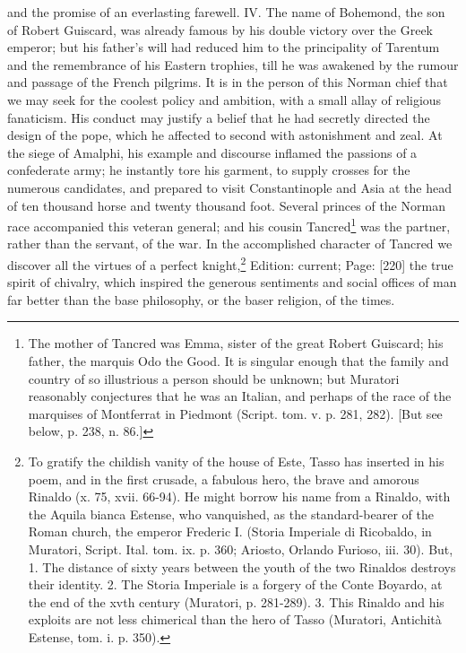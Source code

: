 and the promise of an everlasting farewell. IV. The name of Bohemond, the son of Robert Guiscard, was already famous by his double victory over the Greek emperor; but his father\texthebrew{}’s will had reduced him to the principality of Tarentum and the remembrance of his Eastern trophies, till he was awakened by the rumour and passage of the French pilgrims. It is in the person of this Norman chief that we may seek for the coolest policy and ambition, with a small allay of religious fanaticism. His conduct may justify a belief that he had secretly directed the design of the pope, which he affected to second with astonishment and zeal. At the siege of Amalphi, his example and discourse inflamed the passions of a confederate army; he instantly tore his garment, to supply crosses for the numerous candidates, and prepared to visit Constantinople and Asia at the head of ten thousand horse and twenty thousand foot. Several princes of the Norman race accompanied this veteran general; and his cousin Tancred\footnote{The mother of Tancred was Emma, sister of the great Robert Guiscard; his father, the marquis Odo the Good. It is singular enough that the family and country of so illustrious a person should be unknown; but Muratori reasonably conjectures that he was an Italian, and perhaps of the race of the marquises of Montferrat in Piedmont (Script. tom. v. p. 281, 282). [But see below, p. 238, n. 86.]} was the partner, rather than the servant, of the war. In the accomplished character of Tancred we discover all the virtues of a perfect knight,\footnote{To gratify the childish vanity of the house of Este, Tasso has inserted in his poem, and in the first crusade, a fabulous hero, the brave and amorous Rinaldo (x. 75, xvii. 66-94). He might borrow his name from a Rinaldo, with the Aquila bianca Estense, who vanquished, as the standard-bearer of the Roman church, the emperor Frederic I. (Storia Imperiale di Ricobaldo, in Muratori, Script. Ital. tom. ix. p. 360; Ariosto, Orlando Furioso, iii. 30). But, 1. The distance of sixty years between the youth of the two Rinaldos destroys their identity. 2. The Storia Imperiale is a forgery of the Conte Boyardo, at the end of the xvth century (Muratori, p. 281-289). 3. This Rinaldo and his exploits are not less chimerical than the hero of Tasso (Muratori, Antichità Estense, tom. i. p. 350).} Edition: current; Page: [220] the true spirit of chivalry, which inspired the generous sentiments and social offices of man far better than the base philosophy, or the baser religion, of the times.

